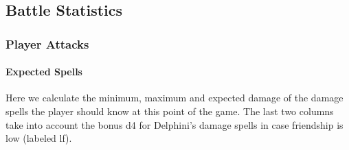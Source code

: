 \subsection{Battle Statistics}

\subsubsection{Player Attacks}
\paragraph{Expected Spells} Here we calculate the minimum, maximum and expected damage of the damage spells the player should know at this point of the game. The last two columns take into account the bonus d4 for Delphini's damage spells in case friendship is low (labeled lf).\\

